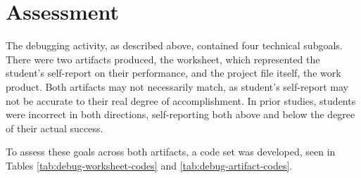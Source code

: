 \section{Assessment}

The debugging activity, as described above, contained four technical subgoals. There were two artifacts produced, the worksheet, which represented the student's self-report on their performance, and the project file itself, the work product. Both artifacts may not necessarily match, as student's self-report may not be accurate to their real degree of accomplishment. In prior studies, students were incorrect in both directions, self-reporting both above and below the degree of their actual success. 

To assess these goals across both artifacts, a code set was developed, seen in Tables \ref{tab:debug-worksheet-codes} and \ref{tab:debug-artifact-codes}. %


